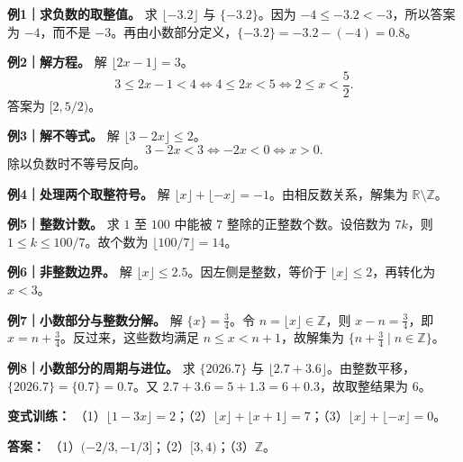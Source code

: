 \clearpage
\begin{examplebox}
\textbf{例1｜求负数的取整值。} 求 $\lfloor-3.2\rfloor$ 与 $\{-3.2\}$。因为 $-4\le-3.2<-3$，所以答案为 $-4$，而不是 $-3$。再由小数部分定义，$\{-3.2\}=-3.2-(-4)=0.8$。

\textbf{例2｜解方程。} 解 $\lfloor2x-1\rfloor=3$。
\[3\le2x-1<4\iff4\le2x<5\iff2\le x<\frac52.\]
答案为 $[2,5/2)$。

\textbf{例3｜解不等式。} 解 $\lfloor3-2x\rfloor\le2$。
\[3-2x<3\iff-2x<0\iff x>0.\]
除以负数时不等号反向。
\end{examplebox}
\clearpage
\begin{examplebox}
\textbf{例4｜处理两个取整符号。} 解 $\lfloor x\rfloor+\lfloor-x\rfloor=-1$。由相反数关系，解集为 $\mathbb R\setminus\mathbb Z$。

\textbf{例5｜整数计数。} 求 $1$ 至 $100$ 中能被 $7$ 整除的正整数个数。设倍数为 $7k$，则 $1\le k\le100/7$。故个数为 $\lfloor100/7\rfloor=14$。

\textbf{例6｜非整数边界。} 解 $\lfloor x\rfloor\le2.5$。因左侧是整数，等价于 $\lfloor x\rfloor\le2$，再转化为 $x<3$。

\textbf{例7｜小数部分与整数分解。} 解 $\{x\}=\frac34$。令 $n=\lfloor x\rfloor\in\mathbb Z$，则 $x-n=\frac34$，即 $x=n+\frac34$。反过来，这些数均满足 $n\le x<n+1$，故解集为 $\{n+\frac34\mid n\in\mathbb Z\}$。

\textbf{例8｜小数部分的周期与进位。} 求 $\{2026.7\}$ 与 $\lfloor 2.7+3.6\rfloor$。由整数平移，$\{2026.7\}=\{0.7\}=0.7$。又 $2.7+3.6=5+1.3=6+0.3$，故取整结果为 $6$。

\textbf{变式训练：} （1）$\lfloor 1-3x\rfloor=2$；（2）$\lfloor x\rfloor+\lfloor x+1\rfloor=7$；（3）$\lfloor x\rfloor+\lfloor-x\rfloor=0$。

\textbf{答案：} （1）$(-2/3,-1/3]$；（2）$[3,4)$；（3）$\mathbb Z$。
\end{examplebox}
